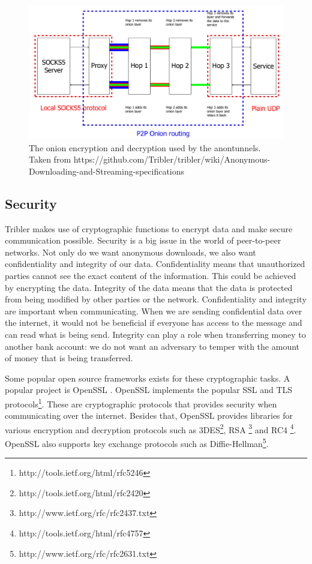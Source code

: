 			\begin{figure}[!htb]
				\centering
				\includegraphics[width=\textwidth]{graphics/onion_encryption_decryption_socks5.png}
				\caption{The onion encryption and decryption used by the anontunnels. Taken from https://github.com/Tribler/tribler/wiki/Anonymous-Downloading-and-Streaming-specifications}
				\label{fig:onion_encryption_decryption_socks5}
			\end{figure}

	\subsection{Security}
	\label{sec:security}
		Tribler makes use of cryptographic functions to encrypt data and make secure communication possible. Security is a big issue in the world of peer-to-peer networks. Not only do we want anonymous downloads, we also want confidentiality and integrity of our data. Confidentiality means that unauthorized parties cannot see the exact content of the information. This could be achieved by encrypting the data. Integrity of the data means that the data is protected from being modified by other parties or the network. Confidentiality and integrity are important when communicating. When we are sending confidential data over the internet, it would not be beneficial if everyone has access to the message and can read what is being send. Integrity can play a role when transferring money to another bank account: we do not want an adversary to temper with the amount of money that is being transferred.
		
		Some popular open source frameworks exists for these cryptographic tasks. A popular project is OpenSSL \cite{openssl}. OpenSSL implements the popular SSL and TLS protocols\footnote{http://tools.ietf.org/html/rfc5246}. These are cryptographic protocols that provides security when communicating over the internet. Besides that, OpenSSL provides libraries for various encryption and decryption protocols such as 3DES\footnote{http://tools.ietf.org/html/rfc2420}, RSA \footnote{http://www.ietf.org/rfc/rfc2437.txt} and RC4 \footnote{http://tools.ietf.org/html/rfc4757}. OpenSSL also supports key exchange protocols such as Diffie-Hellman\footnote{http://www.ietf.org/rfc/rfc2631.txt}.
		
